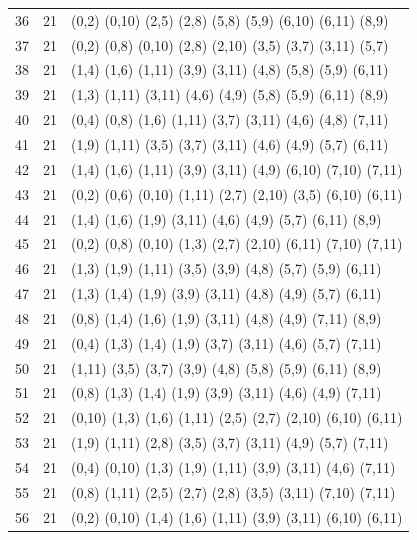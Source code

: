 \begin{appendix}
{\begin{longtable}{lll}
    36 & 21 & (0,2)   (0,10)  (2,5)   (2,8)   (5,8)   (5,9)   (6,10)  (6,11)  (8,9)\\
    37 & 21 & (0,2)   (0,8)   (0,10)  (2,8)   (2,10)  (3,5)   (3,7)   (3,11)  (5,7)\\
    38 & 21 & (1,4)   (1,6)   (1,11)  (3,9)   (3,11)  (4,8)   (5,8)   (5,9)   (6,11)\\
    39 & 21 & (1,3)   (1,11)  (3,11)  (4,6)   (4,9)   (5,8)   (5,9)   (6,11)  (8,9)\\
    40 & 21 & (0,4)   (0,8)   (1,6)   (1,11)  (3,7)   (3,11)  (4,6)   (4,8)   (7,11)\\
    41 & 21 & (1,9)   (1,11)  (3,5)   (3,7)   (3,11)  (4,6)   (4,9)   (5,7)   (6,11)\\
    42 & 21 & (1,4)   (1,6)   (1,11)  (3,9)   (3,11)  (4,9)   (6,10)  (7,10)  (7,11)\\
    43 & 21 & (0,2)   (0,6)   (0,10)  (1,11)  (2,7)   (2,10)  (3,5)   (6,10)  (6,11)\\
    44 & 21 & (1,4)   (1,6)   (1,9)   (3,11)  (4,6)   (4,9)   (5,7)   (6,11)  (8,9)\\
    45 & 21 & (0,2)   (0,8)   (0,10)  (1,3)   (2,7)   (2,10)  (6,11)  (7,10)  (7,11)\\
    46 & 21 & (1,3)   (1,9)   (1,11)  (3,5)   (3,9)   (4,8)   (5,7)   (5,9)   (6,11)\\
    47 & 21 & (1,3)   (1,4)   (1,9)   (3,9)   (3,11)  (4,8)   (4,9)   (5,7)   (6,11)\\
    48 & 21 & (0,8)   (1,4)   (1,6)   (1,9)   (3,11)  (4,8)   (4,9)   (7,11)  (8,9)\\
    49 & 21 & (0,4)   (1,3)   (1,4)   (1,9)   (3,7)   (3,11)  (4,6)   (5,7)   (7,11)\\
    50 & 21 & (1,11)  (3,5)   (3,7)   (3,9)   (4,8)   (5,8)   (5,9)   (6,11)  (8,9)\\
    51 & 21 & (0,8)   (1,3)   (1,4)   (1,9)   (3,9)   (3,11)  (4,6)   (4,9)   (7,11)\\
    52 & 21 & (0,10)  (1,3)   (1,6)   (1,11)  (2,5)   (2,7)   (2,10)  (6,10)  (6,11)\\
    53 & 21 & (1,9)   (1,11)  (2,8)   (3,5)   (3,7)   (3,11)  (4,9)   (5,7)   (7,11)\\
    54 & 21 & (0,4)   (0,10)  (1,3)   (1,9)   (1,11)  (3,9)   (3,11)  (4,6)   (7,11)\\
    55 & 21 & (0,8)   (1,11)  (2,5)   (2,7)   (2,8)   (3,5)   (3,11)  (7,10)  (7,11)\\
    56 & 21 & (0,2)   (0,10)  (1,4)   (1,6)   (1,11)  (3,9)   (3,11)  (6,10)  (6,11)\\

\end{longtable}}
\end{appendix}
